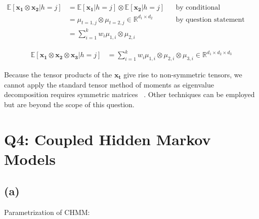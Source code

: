 \documentclass[11pt]{amsart}
\newcommand{\vek}[1]{\mathbf{#1}}
\begin{document}
\begin{equation}
\begin{aligned}
\mathbb{E}[\vek{x_1} \otimes \vek{x_2} \vert h=j] &= \mathbb{E}[\vek{x_1} \vert h=j] \otimes \mathbb{E}[\vek{x_2} \vert h=j] && \text{by conditional independence} \\
								           &= \mu_{t=1, j} \otimes \mu_{t=2, j}  \in \mathbb{R}^{d_1 \times d_2}&& \text{by question statement}\\
								           &= \sum_{i=1}^k w_i \mu_{1,i} \otimes \mu_{2, i}
\end{aligned}
\end{equation}

\begin{equation}
\begin{aligned}
\mathbb{E}[\vek{x_1} \otimes \vek{x_2} \otimes \vek{x_3} \vert h=j] &= \sum_{i=1}^k w_i \mu_{1,i} \otimes \mu_{2, i} \otimes \mu_{3, i} \in \mathbb{R}^{d_1 \times d_2 \times d_3}
\end{aligned}
\end{equation}

Because the tensor products of the $\vek{x_t}$ give rise to non-symmetric tensors, we cannot apply the standard tensor method of moments as eigenvalue decomposition requires symmetric matrices ~\cite{anandkumar2014tensor}. Other techniques can be employed but are beyond the scope of this question.

\section{Q4: Coupled Hidden Markov Models}

\subsection{(a)}

Parametrization of CHMM:
\end{document}
